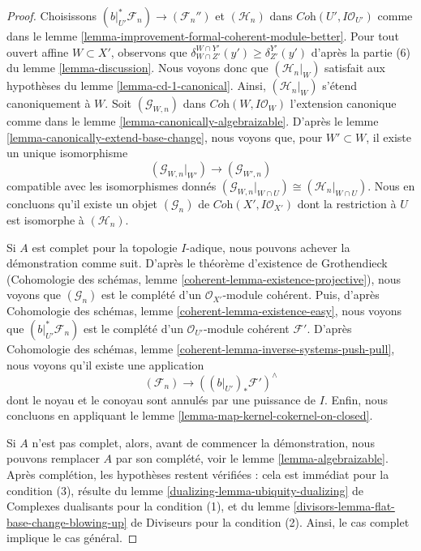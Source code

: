 \begin{proof}
\medskip\noindent
Choisissons $(b|_{U'}^*\mathcal{F}_n) \to (\mathcal{F}_n'')$
et $(\mathcal{H}_n)$ dans $\textit{Coh}(U', I\mathcal{O}_{U'})$
comme dans le lemme \ref{lemma-improvement-formal-coherent-module-better}.
Pour tout ouvert affine $W \subset X'$, observons que
$\delta^{W \cap Y'}_{W \cap Z'}(y') \geq \delta^{Y'}_{Z'}(y')$ d'après la
partie (6) du lemme \ref{lemma-discussion}. Nous voyons donc que
$(\mathcal{H}_n|_W)$ satisfait aux hypothèses du
lemme \ref{lemma-cd-1-canonical}.
Ainsi, $(\mathcal{H}_n|_W)$ s'étend canoniquement à $W$.
Soit $(\mathcal{G}_{W, n})$ dans $\textit{Coh}(W, I\mathcal{O}_W)$
l'extension canonique comme dans le
lemme \ref{lemma-canonically-algebraizable}.
D'après le lemme \ref{lemma-canonically-extend-base-change},
nous voyons que, pour $W' \subset W$, il existe un unique isomorphisme
$$
(\mathcal{G}_{W, n}|_{W'}) \longrightarrow
(\mathcal{G}_{W', n})
$$
compatible avec les isomorphismes donnés
$(\mathcal{G}_{W, n}|_{W \cap U}) \cong (\mathcal{H}_n|_{W \cap U})$.
Nous en concluons qu'il existe un objet
$(\mathcal{G}_n)$ de $\textit{Coh}(X', I\mathcal{O}_{X'})$
dont la restriction à $U$ est isomorphe à $(\mathcal{H}_n)$.

\medskip\noindent
Si $A$ est complet pour la topologie $I$-adique, nous pouvons achever la démonstration comme suit.
D'après le théorème d'existence de Grothendieck
(Cohomologie des schémas, lemme \ref{coherent-lemma-existence-projective}),
nous voyons que $(\mathcal{G}_n)$ est le complété d'un
$\mathcal{O}_{X'}$-module cohérent. Puis, d'après
Cohomologie des schémas, lemme \ref{coherent-lemma-existence-easy},
nous voyons que $(b|_{U'}^*\mathcal{F}_n)$
est le complété d'un $\mathcal{O}_{U'}$-module cohérent
$\mathcal{F}'$.
D'après Cohomologie des schémas, lemme \ref{coherent-lemma-inverse-systems-push-pull},
nous voyons qu'il existe une application
$$
(\mathcal{F}_n) \longrightarrow ((b|_{U'})_*\mathcal{F}')^\wedge
$$
dont le noyau et le conoyau sont annulés par une puissance de $I$.
Enfin, nous concluons en appliquant le
lemme \ref{lemma-map-kernel-cokernel-on-closed}.

\medskip\noindent
Si $A$ n'est pas complet, alors, avant de commencer la démonstration, nous pouvons remplacer $A$
par son complété, voir le lemme \ref{lemma-algebraizable}.
Après complétion, les hypothèses restent vérifiées : cela est immédiat
pour la condition (3), résulte du
lemme \ref{dualizing-lemma-ubiquity-dualizing} de Complexes dualisants
pour la condition (1), et du
lemme \ref{divisors-lemma-flat-base-change-blowing-up} de Diviseurs
pour la condition (2).
Ainsi, le cas complet implique le cas général.
\end{proof}

